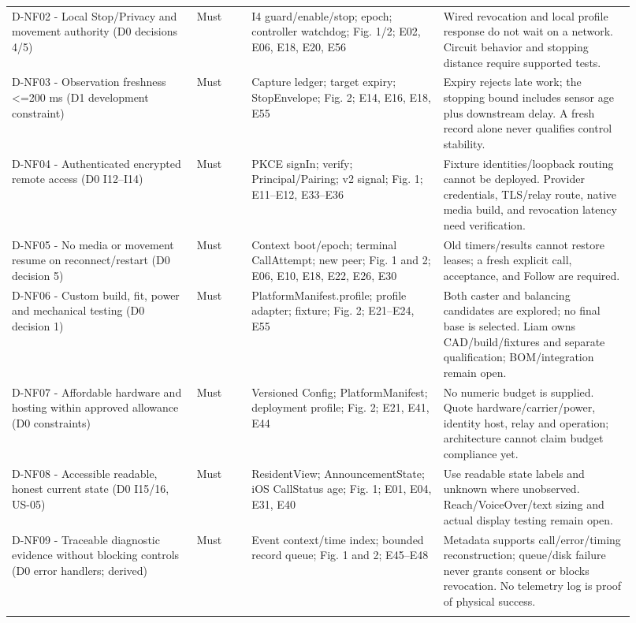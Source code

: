 \documentclass[12pt,letterpaper]{article}
\begin{document}
\begin{longtable}{@{}>{\RaggedRight\arraybackslash}p{0.27\linewidth}>{\RaggedRight\arraybackslash}p{0.08\linewidth}>{\RaggedRight\arraybackslash}p{0.28\linewidth}>{\RaggedRight\arraybackslash}p{0.285\linewidth}@{}}
D-NF02 - Local Stop/Privacy and movement authority (D0 decisions 4/5) & Must & I4 guard/enable/stop; epoch; controller watchdog; Fig. 1/2; E02, E06, E18, E20, E56 & Wired revocation and local profile response do not wait on a network. Circuit behavior and stopping distance require supported tests. \\ \addlinespace[3pt]
D-NF03 - Observation freshness <=200 ms (D1 development constraint) & Must & Capture ledger; target expiry; StopEnvelope; Fig. 2; E14, E16, E18, E55 & Expiry rejects late work; the stopping bound includes sensor age plus downstream delay. A fresh record alone never qualifies control stability. \\ \addlinespace[3pt]
D-NF04 - Authenticated encrypted remote access (D0 I12--I14) & Must & PKCE signIn; verify; Principal/Pairing; v2 signal; Fig. 1; E11--E12, E33--E36 & Fixture identities/loopback routing cannot be deployed. Provider credentials, TLS/relay route, native media build, and revocation latency need verification. \\ \addlinespace[3pt]
D-NF05 - No media or movement resume on reconnect/restart (D0 decision 5) & Must & Context boot/epoch; terminal CallAttempt; new peer; Fig. 1 and 2; E06, E10, E18, E22, E26, E30 & Old timers/results cannot restore leases; a fresh explicit call, acceptance, and Follow are required. \\ \addlinespace[3pt]
D-NF06 - Custom build, fit, power and mechanical testing (D0 decision 1) & Must & PlatformManifest.profile; profile adapter; fixture; Fig. 2; E21--E24, E55 & Both caster and balancing candidates are explored; no final base is selected. Liam owns CAD/build/fixtures and separate qualification; BOM/integration remain open. \\ \addlinespace[3pt]
D-NF07 - Affordable hardware and hosting within approved allowance (D0 constraints) & Must & Versioned Config; PlatformManifest; deployment profile; Fig. 2; E21, E41, E44 & No numeric budget is supplied. Quote hardware/carrier/power, identity host, relay and operation; architecture cannot claim budget compliance yet. \\ \addlinespace[3pt]
D-NF08 - Accessible readable, honest current state (D0 I15/16, US-05) & Must & ResidentView; AnnouncementState; iOS CallStatus age; Fig. 1; E01, E04, E31, E40 & Use readable state labels and unknown where unobserved. Reach/VoiceOver/text sizing and actual display testing remain open. \\ \addlinespace[3pt]
D-NF09 - Traceable diagnostic evidence without blocking controls (D0 error handlers; derived) & Must & Event context/time index; bounded record queue; Fig. 1 and 2; E45--E48 & Metadata supports call/error/timing reconstruction; queue/disk failure never grants consent or blocks revocation. No telemetry log is proof of physical success. \\ \addlinespace[3pt]

\end{longtable}
\end{document}

